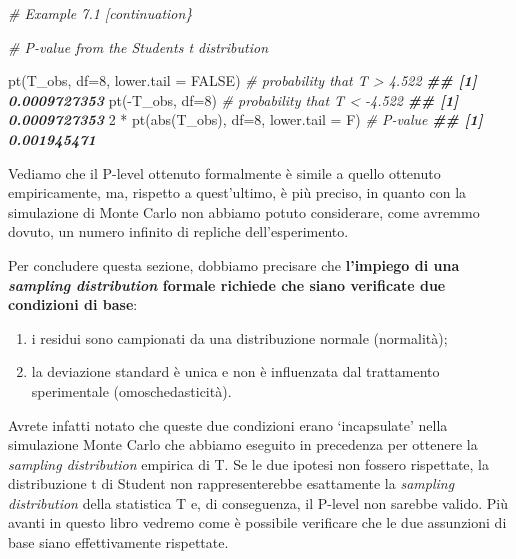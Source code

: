 \documentclass[
  12pt,
]{book}
\newenvironment{Shaded}{\begin{snugshade}}{\end{snugshade}}
\newcommand{\AttributeTok}[1]{\textcolor[rgb]{0.77,0.63,0.00}{#1}}
\newcommand{\CommentTok}[1]{\textcolor[rgb]{0.56,0.35,0.01}{\textit{#1}}}
\newcommand{\ConstantTok}[1]{\textcolor[rgb]{0.00,0.00,0.00}{#1}}
\newcommand{\DecValTok}[1]{\textcolor[rgb]{0.00,0.00,0.81}{#1}}
\newcommand{\DocumentationTok}[1]{\textcolor[rgb]{0.56,0.35,0.01}{\textbf{\textit{#1}}}}
\newcommand{\FunctionTok}[1]{\textcolor[rgb]{0.00,0.00,0.00}{#1}}
\newcommand{\NormalTok}[1]{#1}
\newcommand{\SpecialCharTok}[1]{\textcolor[rgb]{0.00,0.00,0.00}{#1}}
\providecommand{\tightlist}{%
  \setlength{\itemsep}{0pt}\setlength{\parskip}{0pt}}
\begin{document}
\vspace{12pt}

\begin{Shaded}
\begin{Highlighting}[]
\CommentTok{\# Example 7.1 [continuation\}}

\CommentTok{\# P{-}value from the Student\textquotesingle{}s t distribution}

\FunctionTok{pt}\NormalTok{(T\_obs, }\AttributeTok{df=}\DecValTok{8}\NormalTok{, }\AttributeTok{lower.tail =} \ConstantTok{FALSE}\NormalTok{) }\CommentTok{\# probability that T \textgreater{} 4.522}
\DocumentationTok{\#\# [1] 0.0009727353}
\FunctionTok{pt}\NormalTok{(}\SpecialCharTok{{-}}\NormalTok{T\_obs, }\AttributeTok{df=}\DecValTok{8}\NormalTok{) }\CommentTok{\# probability that T \textless{} {-}4.522}
\DocumentationTok{\#\# [1] 0.0009727353}
\DecValTok{2} \SpecialCharTok{*} \FunctionTok{pt}\NormalTok{(}\FunctionTok{abs}\NormalTok{(T\_obs), }\AttributeTok{df=}\DecValTok{8}\NormalTok{, }\AttributeTok{lower.tail =}\NormalTok{ F) }\CommentTok{\# P{-}value}
\DocumentationTok{\#\# [1] 0.001945471}
\end{Highlighting}
\end{Shaded}

Vediamo che il P-level ottenuto formalmente è simile a quello ottenuto empiricamente, ma, rispetto a quest'ultimo, è più preciso, in quanto con la simulazione di Monte Carlo non abbiamo potuto considerare, come avremmo dovuto, un numero infinito di repliche dell'esperimento.

Per concludere questa sezione, dobbiamo precisare che \textbf{l'impiego di una \emph{sampling distribution} formale richiede che siano verificate due condizioni di base}:

\begin{enumerate}
\def\labelenumi{\arabic{enumi}.}
\tightlist
\item
  i residui sono campionati da una distribuzione normale (normalità);
\item
  la deviazione standard è unica e non è influenzata dal trattamento sperimentale (omoschedasticità).
\end{enumerate}

Avrete infatti notato che queste due condizioni erano `incapsulate' nella simulazione Monte Carlo che abbiamo eseguito in precedenza per ottenere la \emph{sampling distribution} empirica di T. Se le due ipotesi non fossero rispettate, la distribuzione t di Student non rappresenterebbe esattamente la \emph{sampling distribution} della statistica T e, di conseguenza, il P-level non sarebbe valido. Più avanti in questo libro vedremo come è possibile verificare che le due assunzioni di base siano effettivamente rispettate.
\end{document}
